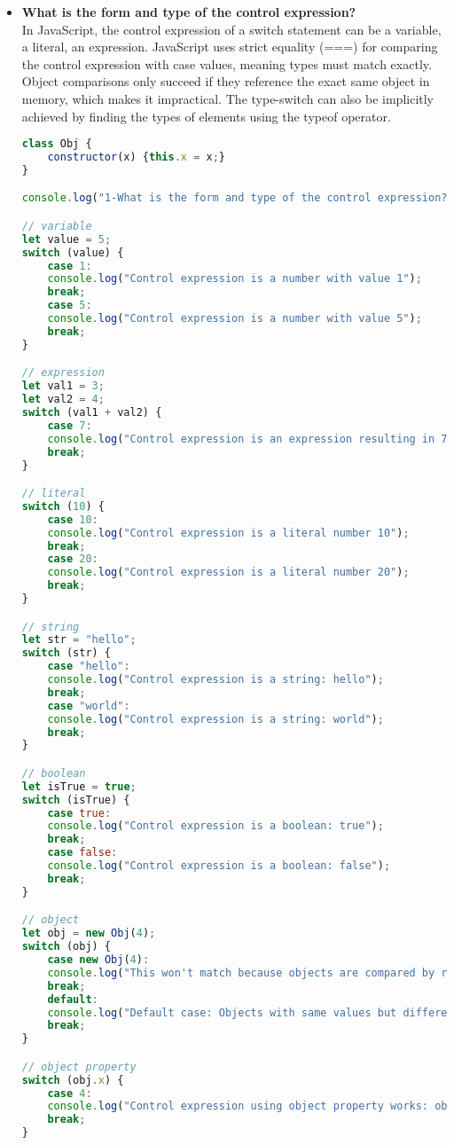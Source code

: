 \documentclass{article}
\begin{document}
\begin{itemize}
\item \textbf{What is the form and type of the control expression?} \\
In JavaScript, the control expression of a switch statement can be a variable, a literal, an expression. JavaScript uses strict equality (===) for comparing the control expression with case values, meaning types must match exactly. Object comparisons only succeed if they reference the exact same object in memory, which makes it impractical. The type-switch can also be implicitly achieved by finding the types of elements using the typeof operator. 
\begin{lstlisting}[language=JavaScript]
class Obj {
    constructor(x) {this.x = x;}
}

console.log("1-What is the form and type of the control expression?");

// variable
let value = 5;
switch (value) {
    case 1:
    console.log("Control expression is a number with value 1");
    break;
    case 5:
    console.log("Control expression is a number with value 5");
    break;
}

// expression
let val1 = 3;
let val2 = 4;
switch (val1 + val2) {
    case 7:
    console.log("Control expression is an expression resulting in 7");
    break;
}

// literal
switch (10) {
    case 10:
    console.log("Control expression is a literal number 10");
    break;
    case 20:
    console.log("Control expression is a literal number 20");
    break;
}

// string
let str = "hello";
switch (str) {
    case "hello":
    console.log("Control expression is a string: hello");
    break;
    case "world":
    console.log("Control expression is a string: world");
    break;
}

// boolean
let isTrue = true;
switch (isTrue) {
    case true:
    console.log("Control expression is a boolean: true");
    break;
    case false:
    console.log("Control expression is a boolean: false");
    break;
}

// object
let obj = new Obj(4);
switch (obj) {
    case new Obj(4):
    console.log("This won't match because objects are compared by reference");
    break;
    default:
    console.log("Default case: Objects with same values but different references don't match");
    break;
}

// object property
switch (obj.x) {
    case 4:
    console.log("Control expression using object property works: obj.x = 4");
    break;
}


\end{lstlisting}
\end{itemize}
\end{document}
